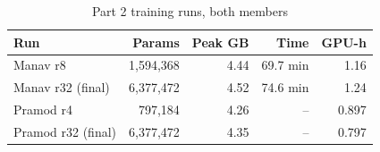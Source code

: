 \begin{table}[t]
\caption{Part 2 training runs, both members}
\label{tab:p2-training}
\centering\small
\begin{tabular}{lrrrr}
\toprule
Run & Params & Peak GB & Time & GPU-h \\
\midrule
Manav r8 & 1{,}594{,}368 & 4.44 & 69.7 min & 1.16 \\
Manav r32 (final) & 6{,}377{,}472 & 4.52 & 74.6 min & 1.24 \\
Pramod r4 & 797{,}184 & 4.26 & -- & 0.897 \\
Pramod r32 (final) & 6{,}377{,}472 & 4.35 & -- & 0.797 \\
\bottomrule
\end{tabular}
\end{table}
